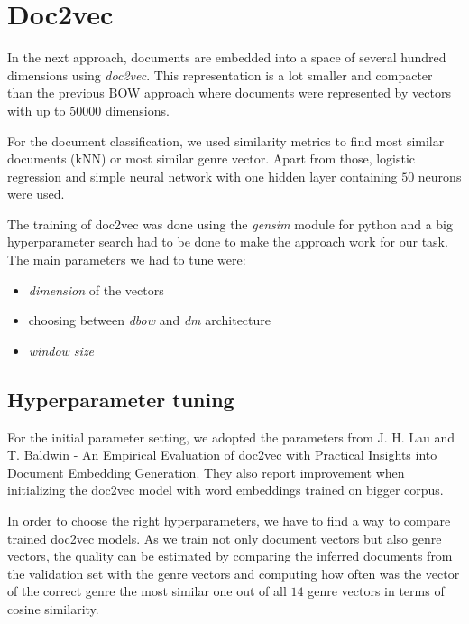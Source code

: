 



\section{Doc2vec}
In the next approach, documents are embedded into a space of several hundred dimensions using \textit{doc2vec}. This representation is a lot smaller and compacter than the previous BOW approach where documents were represented by vectors with up to $50000$ dimensions.

For the document classification, we used similarity metrics to find most similar documents (kNN) or most similar genre vector. Apart from those,  logistic regression and simple neural network with one hidden layer containing $50$ neurons were used.

The training of doc2vec was done using the \textit{gensim}\cite{gensim} module for python and a big hyperparameter search had to be done to make the approach work for our task. The main parameters we had to tune were:

\begin{itemize}
  \item \textit{dimension} of the vectors
  \item choosing between \textit{dbow} and \textit{dm} architecture
  \item \textit{window size}
\end{itemize}

\subsection{Hyperparameter tuning}
For the initial parameter setting, we adopted the parameters from J. H. Lau and T. Baldwin - An Empirical Evaluation of doc2vec with Practical Insights into Document Embedding Generation\cite{doc2vec_params}. They also report improvement when initializing the doc2vec model with word embeddings trained on bigger corpus.

In order to choose the right hyperparameters, we have to find a way to compare trained doc2vec models. As we train not only document vectors but also genre vectors, the quality can be estimated by comparing the inferred documents from the validation set with the genre vectors and computing how often was the vector of the correct genre the most similar one out of all $14$ genre vectors in terms of cosine similarity.

